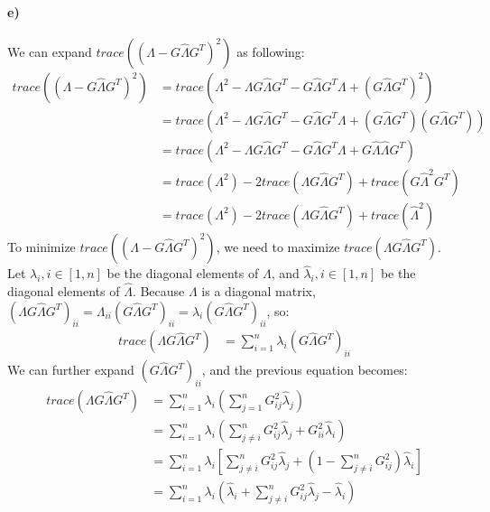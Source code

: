 \documentclass{article}
\begin{document}
\paragraph{e)} We can expand $trace((\Lambda - G \hat{\Lambda} G^T)^2)$ as following:
\begin{align*}
trace((\Lambda - G \hat{\Lambda} G^T)^2) &= trace(\Lambda^2 - \Lambda G \hat{\Lambda} G^T - G \hat{\Lambda} G^T \Lambda + (G \hat{\Lambda} G^T)^2) \\
&= trace(\Lambda^2 - \Lambda G \hat{\Lambda} G^T - G \hat{\Lambda} G^T \Lambda + (G \hat{\Lambda} G^T)(G \hat{\Lambda} G^T))\\
&= trace(\Lambda^2 - \Lambda G \hat{\Lambda} G^T - G \hat{\Lambda} G^T \Lambda + G \hat{\Lambda} \hat{\Lambda} G^T) \\
&= trace(\Lambda^2) - 2trace(\Lambda G \hat{\Lambda} G^T) + trace(G \hat{\Lambda}^2 G^T) \\
&= trace(\Lambda^2) - 2trace(\Lambda G \hat{\Lambda} G^T) + trace(\hat{\Lambda}^2)
\end{align*}
To minimize $trace((\Lambda - G \hat{\Lambda} G^T)^2)$, we need to maximize $trace(\Lambda G \hat{\Lambda} G^T)$. Let $\lambda_i, i \in [1, n]$ be the diagonal elements of $\Lambda$, and $\hat{\lambda}_i, i \in [1, n]$ be the diagonal elements of $\hat{\Lambda}$. \newline Because $\Lambda$ is a diagonal matrix, $(\Lambda G \hat{\Lambda} G^T)_{ii} = \Lambda_{ii} (G \hat{\Lambda} G^T)_{ii} = \lambda_i (G \hat{\Lambda} G^T)_{ii}$, so:
\begin{align*}
trace(\Lambda G \hat{\Lambda} G^T) &= \sum^{n}_{i=1}\lambda_i(G \hat{\Lambda} G^T)_{ii}
\end{align*}
We can further expand $(G \hat{\Lambda} G^T)_{ii}$, and the previous equation becomes:
\begin{align*}
trace(\Lambda G \hat{\Lambda} G^T) &= \sum^{n}_{i=1}\lambda_i(\sum^{n}_{j=1} G^2_{ij} \hat{\lambda}_j) \\
&= \sum^{n}_{i=1}\lambda_i(\sum^{n}_{j \ne i} G^2_{ij} \hat{\lambda}_j + G^2_{ii}\hat{\lambda}_i) \\
&= \sum^{n}_{i=1}\lambda_i[\sum^{n}_{j \ne i} G^2_{ij} \hat{\lambda}_j + (1 - \sum^{n}_{j \ne i} G^2_{ij})\hat{\lambda}_i] \\
&= \sum^{n}_{i=1}\lambda_i(\hat{\lambda}_i + \sum^{n}_{j \ne i} G^2_{ij} \hat{\lambda}_j - \hat{\lambda}_i)
\end{align*}
\end{document}
